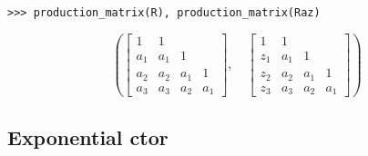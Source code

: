 \begin{example}
\begin{verbatim}
>>> production_matrix(R), production_matrix(Raz)
\end{verbatim}
\begin{displaymath}
\left ( \left[\begin{matrix}1 & 1 &   &  \\a_{1} & a_{1} & 1 &  \\a_{2} & a_{2} & a_{1} & 1\\a_{3} & a_{3} & a_{2} & a_{1}\end{matrix}\right], \quad \left[\begin{matrix}1 & 1 &   &  \\z_{1} & a_{1} & 1 &  \\z_{2} & a_{2} & a_{1} & 1\\z_{3} & a_{3} & a_{2} & a_{1}\end{matrix}\right]\right )
\end{displaymath}
\end{example}

\subsection{Exponential ctor}


